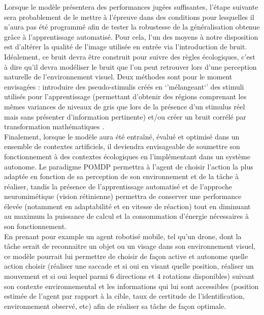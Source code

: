 Lorsque le modèle présentera des performances jugées suffisantes, l'étape suivante sera probablement de le mettre à l'épreuve dans des conditions pour lesquelles il n'aura pas été programmé afin de tester la robustesse de la généralisation obtenue grâce à l'apprentissage automatisé. Pour cela, l'un des moyens à notre disposition est d'altérer la qualité de l'image utilisée en entrée via l'introduction de bruit. 
Idéalement, ce bruit devra être construit pour suivre des règles écologiques, c'est à dire qu'il devra modéliser le bruit que l'on peut retrouver lors d'une perception naturelle de l'environnement visuel. Deux méthodes sont pour le moment envisagées : introduire des pseudo-stimulis créés en `'mélangeant`' des stimuli utilisés pour l'apprentissage (permettant d'obtenir des régions comprenant les mêmes variances de niveaux de gris que lors de la présence d'un stimulus réel mais sans présenter d'information pertinente) et/ou créer un bruit corrélé par transformation mathématiques \autocite{Najemnik2005}. \\

Finalement, lorsque le modèle aura été entraîné, évalué et optimisé dans un ensemble de contextes artificiels, il deviendra envisageable de soumettre son fonctionnement à des contextes écologiques en l'implémentant dans un système autonome.
Le paradigme POMDP permettra à l'agent de choisir l'action la plus adaptée en fonction de sa perception de son environnement et de la tâche à réaliser, tandis la présence de l'apprentissage automatisé et de l'approche neuromimétique (vision rétinienne) permettra de conserver une performance élevée (notamment en adaptabilité et en vitesse de réaction) tout en diminuant au maximum la puissance de calcul et la consommation d'énergie nécessaires à son fonctionnement. \autocite{Potthast2016} \\
En prenant pour example un agent robotisé mobile, tel qu'un drone, dont la tâche serait de reconnaitre un objet ou un visage dans son environnement visuel, ce modèle pourrait lui permettre de choisir de façon active et autonome quelle action choisir (réaliser une saccade et si oui en visant quelle position, réaliser un mouvement et si oui lequel parmi 6 directions et 4 rotations disponibles) suivant son contexte environnemental et les informations qui lui sont accessibles (position estimée de l'agent par rapport à la cible, taux de certitude de l'identification, environnement observé, etc) afin de réaliser sa tâche de façon optimale. \autocite{Potthast2016} \\